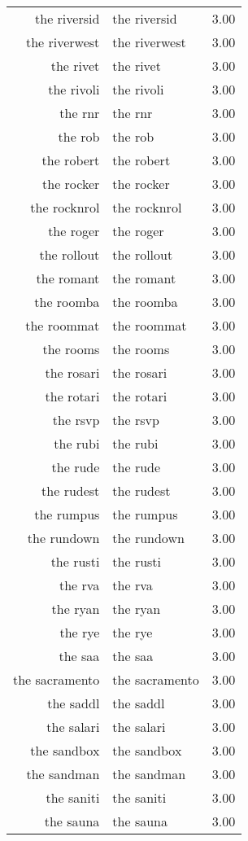 \begin{table}[ht]
\begin{tabular}{rlr}
  the riversid & the riversid & 3.00 \\ 
  the riverwest & the riverwest & 3.00 \\ 
  the rivet & the rivet & 3.00 \\ 
  the rivoli & the rivoli & 3.00 \\ 
  the rnr & the rnr & 3.00 \\ 
  the rob & the rob & 3.00 \\ 
  the robert & the robert & 3.00 \\ 
  the rocker & the rocker & 3.00 \\ 
  the rocknrol & the rocknrol & 3.00 \\ 
  the roger & the roger & 3.00 \\ 
  the rollout & the rollout & 3.00 \\ 
  the romant & the romant & 3.00 \\ 
  the roomba & the roomba & 3.00 \\ 
  the roommat & the roommat & 3.00 \\ 
  the rooms & the rooms & 3.00 \\ 
  the rosari & the rosari & 3.00 \\ 
  the rotari & the rotari & 3.00 \\ 
  the rsvp & the rsvp & 3.00 \\ 
  the rubi & the rubi & 3.00 \\ 
  the rude & the rude & 3.00 \\ 
  the rudest & the rudest & 3.00 \\ 
  the rumpus & the rumpus & 3.00 \\ 
  the rundown & the rundown & 3.00 \\ 
  the rusti & the rusti & 3.00 \\ 
  the rva & the rva & 3.00 \\ 
  the ryan & the ryan & 3.00 \\ 
  the rye & the rye & 3.00 \\ 
  the saa & the saa & 3.00 \\ 
  the sacramento & the sacramento & 3.00 \\ 
  the saddl & the saddl & 3.00 \\ 
  the salari & the salari & 3.00 \\ 
  the sandbox & the sandbox & 3.00 \\ 
  the sandman & the sandman & 3.00 \\ 
  the saniti & the saniti & 3.00 \\ 
  the sauna & the sauna & 3.00 \\ 

\end{tabular}
\end{table}
